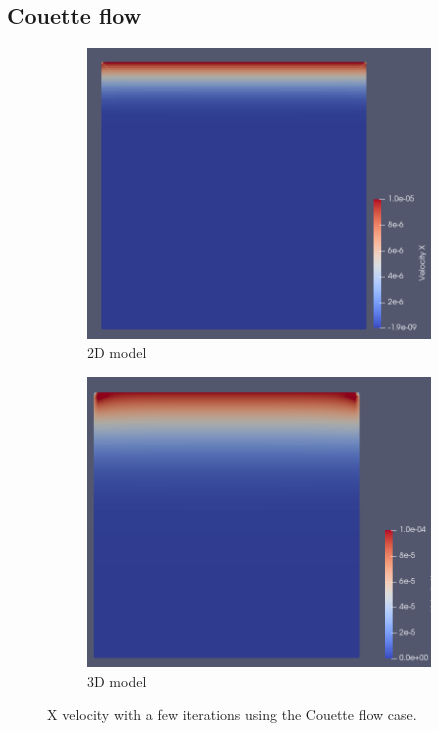 \documentclass[12pt, openany]{book}
\begin{document}
\subsection{Couette flow}
\begin{figure}[H]
	\centering
	\begin{subfigure}{.49\textwidth}
		\includegraphics[width=\linewidth]{Resources/Images/couette.png}
		\caption{2D model}
	\end{subfigure}
	\begin{subfigure}{.49\textwidth}
		\includegraphics[width=\linewidth]{Resources/Images/couette3D.png}
		\caption{3D model}
	\end{subfigure} 
	\caption{X velocity with a few iterations using the Couette flow case.}
	\label{fig:couette}
\end{figure} 
\end{document}
